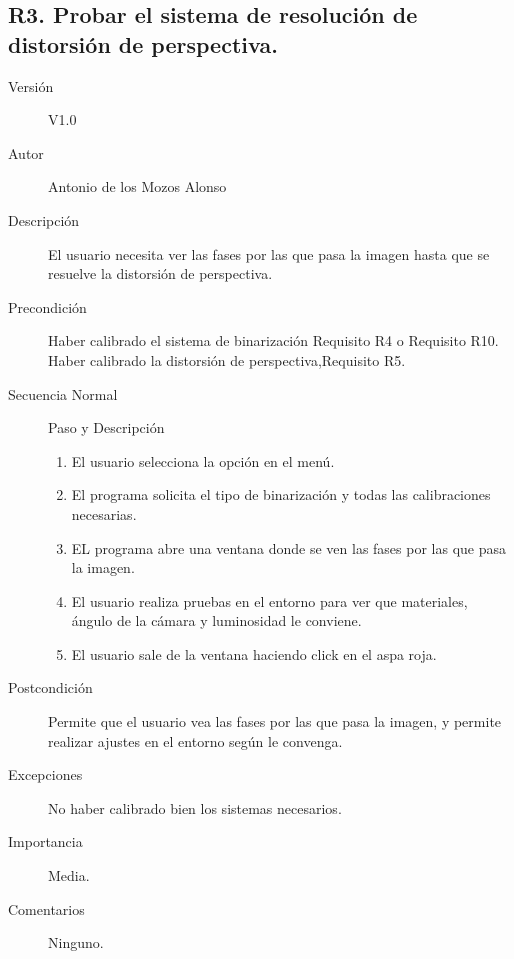 \subsection{R3. Probar el sistema de resolución de distorsión de perspectiva.}
\begin{description}
	\item [Versión] V1.0
	\item [Autor] Antonio de los Mozos Alonso
	\item [Descripción] El usuario necesita ver las fases por las que pasa la imagen hasta que se resuelve la distorsión de perspectiva.
	\item [Precondición] Haber calibrado el sistema de binarización Requisito R4 o Requisito R10. Haber calibrado la distorsión de perspectiva,Requisito R5.
	\item [Secuencia Normal] Paso y Descripción
	
		\begin{enumerate}
			\item El usuario selecciona la opción en el menú.
			\item El programa solicita el tipo de binarización y todas las calibraciones necesarias.
			
			\item EL programa abre una ventana donde se ven las fases por las que pasa la imagen.
			
			\item El usuario realiza pruebas en el entorno para ver que materiales, ángulo de la cámara y luminosidad le conviene. 
			\item El usuario sale de la ventana haciendo click en el aspa roja.
		\end{enumerate}
	\item [Postcondición] Permite que el usuario vea las fases por las que pasa la imagen, y permite realizar ajustes en el entorno según le convenga.
	\item [Excepciones] No haber calibrado bien los sistemas necesarios.
	\item [Importancia] Media.
	\item [Comentarios] Ninguno.
\end{description}

